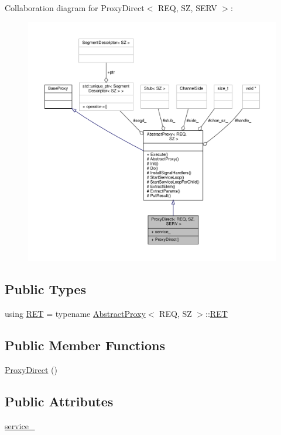 Collaboration diagram for Proxy\+Direct$<$ R\+EQ, SZ, S\+E\+RV $>$\+:
\nopagebreak
\begin{figure}[H]
\begin{center}
\leavevmode
\includegraphics[width=350pt]{classProxyDirect__coll__graph}
\end{center}
\end{figure}
\subsection*{Public Types}
\begin{DoxyCompactItemize}
\item 
using \hyperlink{classProxyDirect_a7ea817de80b380e39bdf58a9ef25726a}{R\+ET} = typename \hyperlink{classAbstractProxy}{Abstract\+Proxy}$<$ R\+EQ, SZ $>$\+::\hyperlink{classAbstractProxy_ab2af611a27c14916a27d0e9249f0291b}{R\+ET}
\end{DoxyCompactItemize}
\subsection*{Public Member Functions}
\begin{DoxyCompactItemize}
\item 
\hyperlink{classProxyDirect_a2c7e97bb43a6418010031f7aa9c5d79b}{Proxy\+Direct} ()
\end{DoxyCompactItemize}
\subsection*{Public Attributes}
\begin{DoxyCompactItemize}
\item 
\hyperlink{classProxyDirect_a2c2d9a268b533d24d49b27f999583910}{service\+\_\+}
\end{DoxyCompactItemize}
